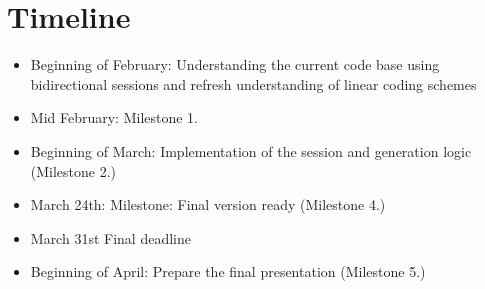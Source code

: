 \documentclass[a4paper, 11pt]{article}
\begin{document}
    \section{Timeline}\label{sec:timeline}
    \begin{itemize}
        \item Beginning of February: Understanding the current code base using bidirectional sessions and refresh understanding of linear coding schemes
        \item Mid February: Milestone 1.
        \item Beginning of March: Implementation of the session and generation logic (Milestone 2.)
        \item March 24th: Milestone: Final version ready (Milestone 4.)
        \item March 31st Final deadline
        \item Beginning of April: Prepare the final presentation (Milestone 5.)
    \end{itemize}
\end{document}
